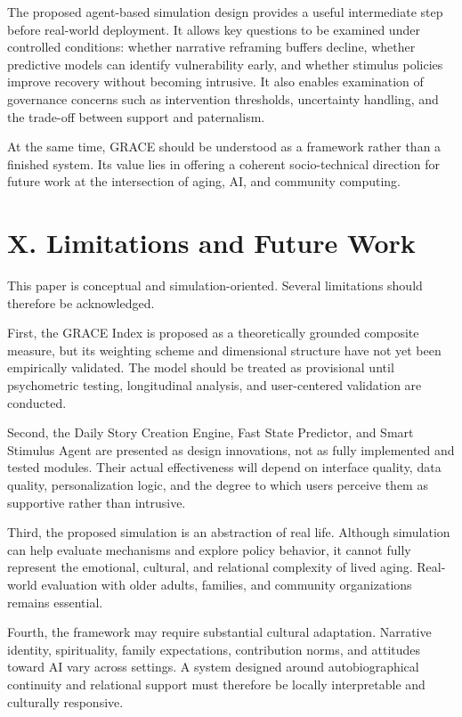 \documentclass[
  journal,
]{IEEEtran}%
\begin{document}
The proposed agent-based simulation design provides a useful
intermediate step before real-world deployment. It allows key questions
to be examined under controlled conditions: whether narrative reframing
buffers decline, whether predictive models can identify vulnerability
early, and whether stimulus policies improve recovery without becoming
intrusive. It also enables examination of governance concerns such as
intervention thresholds, uncertainty handling, and the trade-off between
support and paternalism.

At the same time, GRACE should be understood as a framework rather than
a finished system. Its value lies in offering a coherent socio-technical
direction for future work at the intersection of aging, AI, and
community computing.

\section{X. Limitations and Future
Work}\label{x.-limitations-and-future-work}

This paper is conceptual and simulation-oriented. Several limitations
should therefore be acknowledged.

First, the GRACE Index is proposed as a theoretically grounded composite
measure, but its weighting scheme and dimensional structure have not yet
been empirically validated. The model should be treated as provisional
until psychometric testing, longitudinal analysis, and user-centered
validation are conducted.

Second, the Daily Story Creation Engine, Fast State Predictor, and Smart
Stimulus Agent are presented as design innovations, not as fully
implemented and tested modules. Their actual effectiveness will depend
on interface quality, data quality, personalization logic, and the
degree to which users perceive them as supportive rather than intrusive.

Third, the proposed simulation is an abstraction of real life. Although
simulation can help evaluate mechanisms and explore policy behavior, it
cannot fully represent the emotional, cultural, and relational
complexity of lived aging. Real-world evaluation with older adults,
families, and community organizations remains essential.

Fourth, the framework may require substantial cultural adaptation.
Narrative identity, spirituality, family expectations, contribution
norms, and attitudes toward AI vary across settings. A system designed
around autobiographical continuity and relational support must therefore
be locally interpretable and culturally responsive.
\end{document}
